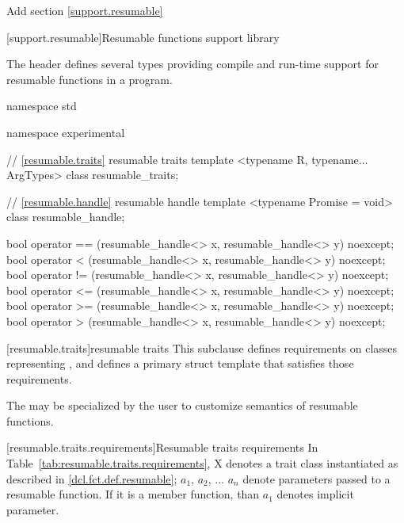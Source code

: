 Add section \ref{support.resumable}

\setcounter{section}{10}
[support.resumable]{Resumable functions support library}

\pnum
The header
defines several types providing compile and run-time support for resumable functions in a \Cpp program.


%
%
\begin{codeblock}
namespace std {
namespace experimental {
  // \ref{resumable.traits} resumable traits
  template <typename R, typename... ArgTypes>
    class resumable_traits;
	
  // \ref{resumable.handle} resumable handle
  template <typename Promise = void>
    class resumable_handle;		
	
  bool operator == (resumable_handle<> x, resumable_handle<> y) noexcept;
  bool operator < (resumable_handle<> x, resumable_handle<> y) noexcept;			
  bool operator != (resumable_handle<> x, resumable_handle<> y) noexcept;
  bool operator <= (resumable_handle<> x, resumable_handle<> y) noexcept;			
  bool operator >= (resumable_handle<> x, resumable_handle<> y) noexcept;
  bool operator > (resumable_handle<> x, resumable_handle<> y) noexcept;			
}
}
\end{codeblock}

[resumable.traits]{resumable traits}
\pnum
This subclause defines requirements on classes representing
,
and defines a primary struct template
that satisfies those requirements.


\pnum
The  may be specialized by the user 
to customize semantics of resumable functions.

[resumable.traits.requirements]{Resumable traits requirements}
\pnum
In Table~\ref{tab:resumable.traits.requirements}, X denotes 
a trait class instantiated as described in \ref{dcl.fct.def.resumable};
$a_1$, $a_2$, ... $a_n$ denote parameters passed to a resumable function. If it is a member function, than $a_1$ denotes implicit  parameter.

